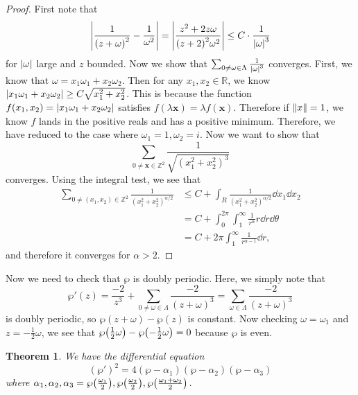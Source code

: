 \documentclass[leqno, openany]{memoir}
\newtheorem{thm}{Theorem}[section]
\theoremstyle{definition}
\theoremstyle{remark}
\theoremstyle{plain}
\theoremstyle{definition}
\theoremstyle{remark}
\newcommand{\R}{\mathbb{R}}
\newcommand{\Z}{\mathbb{Z}}
\begin{document}
\begin{proof} First note that \[ \abs{\frac{1}{{(z+\omega)}^2} -
\frac{1}{\omega^2}} = \abs{\frac{z^2 + 2z\omega}{{(z+2)}^2 \omega^2}} \leq C
\cdot \frac{1}{\abs{\omega}^3} \] for $\abs{\omega}$ large and $z$ bounded. Now
we show that $\sum_{0 \neq \omega \in \Lambda} \frac{1}{\abs{\omega}^3}$
converges. First, we know that $\omega = x_1 \omega_1 + x_2 \omega_2$. Then for
any $x_1, x_2 \in \R$, we know $\abs{x_1 \omega_1 + x_2 \omega_2} \geq C
\sqrt{x_1^2 + x_2^2}$. This is because the function $f(x_1, x_2) = \abs{x_1
\omega_1 + x_2 \omega_2}$ satisfies $f(\lambda \mathbf{x}) = \lambda
f(\mathbf{x})$. Therefore if $\norm{x} = 1$, we know $f$ lands in the positive
reals and has a positive minimum. Therefore, we have reduced to the case where
$\omega_1 = 1, \omega_2 = i$. Now we want to show that \[ \sum_{0 \neq
    \mathbf{x} \in \Z^2} \frac{1}{\sqrt{{(x_1^2 + x_2^2)}^3}} \] converges.
    Using the integral test, we see that \begin{align*} \sum_{0 \neq (x_1, x_2)
        \in \Z^2} \frac{1}{{(x_1^2 + x_2^2)}^{\alpha/2}} &\leq C + \int_R
        \frac{1}{{(x_1^2 + x_2^2)}^{\alpha/2}} \dd{x_1} \dd{x_2} \\ &= C +
    \int_{0}^{2\pi} \int_1^{\infty} \frac{1}{r^{\alpha}} r \dd{r} \dd{\theta}
                                                                 \\ &= C + 2
                                                             \pi
                                                         \int_1^{\infty}
                                                     \frac{1}{r^{\alpha - 1}}
                                                 \dd{r}, \end{align*} and
                                                 therefore it converges for
                                                 $\alpha > 2$.  \end{proof}

Now we need to check that $\wp$ is doubly periodic. Here, we simply note that
\[ \wp'(z) = \frac{-2}{z^3} + \sum_{0 \neq \omega \in \Lambda}
\frac{-2}{{(z+\omega)}^3} = \sum_{\omega \in \Lambda} \frac{-2}{{(z+\omega)}^3}
\] is doubly periodic, so $\wp(z+\omega) - \wp(z)$ is constant. Now checking
$\omega = \omega_1$ and $z = - \frac{1}{2} \omega$, we see that
$\wp\qty(\frac{1}{2} \omega) - \wp\qty(-\frac{1}{2} \omega) = 0$ because $\wp$
is even.

\begin{thm} We have the differential equation \[ {(\wp')}^2 = 4(\wp -
\alpha_1)(\wp - \alpha_2)(\wp-\alpha_3) \] where $\alpha_1, \alpha_2, \alpha_3
= \wp\qty(\frac{\omega_1}{2}), \wp\qty(\frac{\omega_2}{2}),
\wp\qty(\frac{\omega_1 + \omega_2}{2})$.  \end{thm}
\end{document}
